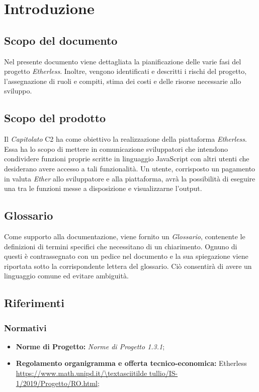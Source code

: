 \section{Introduzione}
\subsection{Scopo del documento}
Nel presente documento viene dettagliata la pianificazione delle varie fasi del progetto \textit{Etherless}. Inoltre, vengono identificati e descritti i rischi del progetto, l'assegnazione di ruoli e compiti, stima dei costi e delle risorse necessarie allo sviluppo.
\subsection{Scopo del prodotto}
Il \textit{Capitolato\glo} C2 ha come obiettivo la realizzazione della piattaforma \textit{Etherless}. Essa ha lo scopo di mettere in comunicazione sviluppatori che intendono condividere funzioni proprie scritte in linguaggio JavaScript con altri utenti che desiderano avere accesso a tali funzionalità. Un utente, corrisposto un pagamento in valuta \textit{Ether\glo} allo sviluppatore e alla piattaforma, avrà la possibilità di eseguire una tra le funzioni messe a disposizione e visualizzarne l'output.

\subsection{Glossario}
Come supporto alla documentazione, viene fornito un \textit{Glossario}\docs,
contenente le definizioni di termini specifici che necessitano di un chiarimento.
Ognuno di questi è contrassegnato con un pedice \glo nel documento e la sua
spiegazione viene riportata sotto la corrispondente lettera del glossario. Ciò
consentir\`a di avere un linguaggio comune ed evitare ambiguità.
\subsection{Riferimenti}
\subsubsection{Normativi}
	\begin{itemize}
		\item \textbf{Norme di Progetto:} \textit{Norme di Progetto 1.3.1}\docs;
		\item \textbf{Regolamento organigramma e offerta tecnico-economica:} Etherless\\ 
			\url{https://www.math.unipd.it/\textasciitilde tullio/IS-1/2019/Progetto/RO.html};
	\end{itemize}
